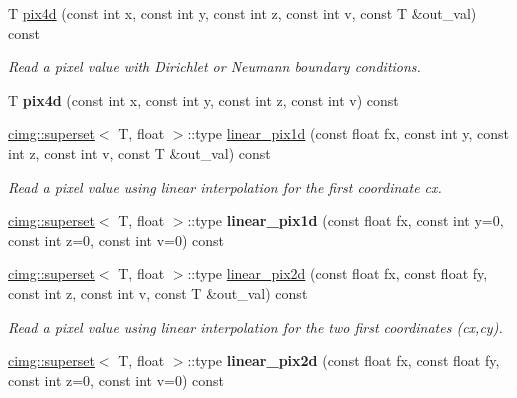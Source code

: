 \begin{DoxyCompactItemize}
\item 
\hypertarget{structcimg__library_1_1_c_img_af366238596df572d60f361a49cbfa22c}{T \hyperlink{structcimg__library_1_1_c_img_af366238596df572d60f361a49cbfa22c}{pix4d} (const int x, const int y, const int z, const int v, const T \&out\-\_\-val) const }\label{structcimg__library_1_1_c_img_af366238596df572d60f361a49cbfa22c}

\begin{DoxyCompactList}\small\item\em Read a pixel value with Dirichlet or Neumann boundary conditions. \end{DoxyCompactList}\item 
\hypertarget{structcimg__library_1_1_c_img_a56fb8028274770f44601e8f129a813b1}{T {\bfseries pix4d} (const int x, const int y, const int z, const int v) const }\label{structcimg__library_1_1_c_img_a56fb8028274770f44601e8f129a813b1}

\item 
\hyperlink{structcimg__library_1_1cimg_1_1superset}{cimg\-::superset}$<$ T, float $>$\-::type \hyperlink{structcimg__library_1_1_c_img_a510052a861eff8b05a02ba2f4427ed62}{linear\-\_\-pix1d} (const float fx, const int y, const int z, const int v, const T \&out\-\_\-val) const 
\begin{DoxyCompactList}\small\item\em Read a pixel value using linear interpolation for the first coordinate {\ttfamily cx}. \end{DoxyCompactList}\item 
\hypertarget{structcimg__library_1_1_c_img_a64d7f2615ab5de61ff2f82cab79b4730}{\hyperlink{structcimg__library_1_1cimg_1_1superset}{cimg\-::superset}$<$ T, float $>$\-::type {\bfseries linear\-\_\-pix1d} (const float fx, const int y=0, const int z=0, const int v=0) const }\label{structcimg__library_1_1_c_img_a64d7f2615ab5de61ff2f82cab79b4730}

\item 
\hyperlink{structcimg__library_1_1cimg_1_1superset}{cimg\-::superset}$<$ T, float $>$\-::type \hyperlink{structcimg__library_1_1_c_img_a94e74f9969caf1db1f862ec9c145ed29}{linear\-\_\-pix2d} (const float fx, const float fy, const int z, const int v, const T \&out\-\_\-val) const 
\begin{DoxyCompactList}\small\item\em Read a pixel value using linear interpolation for the two first coordinates ({\ttfamily cx},{\ttfamily cy}). \end{DoxyCompactList}\item 
\hypertarget{structcimg__library_1_1_c_img_a6725fb6c55a3a10070f2d0f87ee66f60}{\hyperlink{structcimg__library_1_1cimg_1_1superset}{cimg\-::superset}$<$ T, float $>$\-::type {\bfseries linear\-\_\-pix2d} (const float fx, const float fy, const int z=0, const int v=0) const }\label{structcimg__library_1_1_c_img_a6725fb6c55a3a10070f2d0f87ee66f60}


\end{DoxyCompactItemize}
